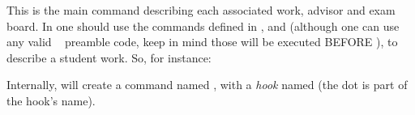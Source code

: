 \documentclass[article,nogeometry,english,tocdepth=3,secdepth=3]{ufrgscca} %
\begin{document}
\begin{codedescribe}{\NewStudent}
	\begin{codesyntax}%
	\end{codesyntax}
	This is the main command describing each  associated work, advisor and exam board. In  one should use the commands defined in , and  (although one can use  any valid \LaTeXe~ preamble code, keep in mind those will be executed BEFORE \tsmacro{\begin{document}}{}), to describe a student work.
	So, for instance:
	\begin{codestore}[st=d.newstudent]
\end{codestore}


\begin{tsremark}[N.B.:]
Internally, \tsmacro{\NewStudent}{} will create a command named \tsmacro{\studentname}{}, with a \emph{hook} named  (the dot is part of the hook's name).
\end{tsremark}
\end{codedescribe}
\end{document}
